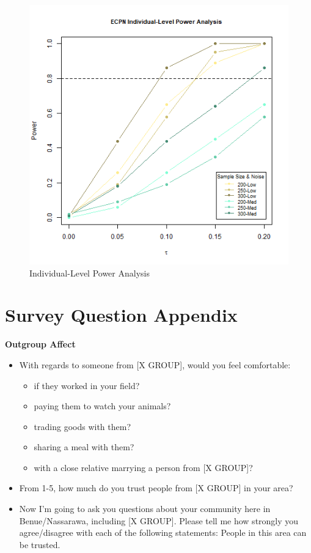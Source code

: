 \documentclass[
]{article}
\providecommand{\tightlist}{%
  \setlength{\itemsep}{0pt}\setlength{\parskip}{0pt}}
\begin{document}
\begin{figure}
\centering
\includegraphics{../../../figures/ecpn_power_figure_ind.png}
\caption{Individual-Level Power Analysis}
\end{figure}

\hypertarget{questions}{%
\section{Survey Question Appendix}\label{questions}}

\textbf{Outgroup Affect}

\begin{itemize}
\tightlist
\item
  With regards to someone from {[}X GROUP{]}, would you feel
  comfortable:

  \begin{itemize}
  \tightlist
  \item
    if they worked in your field?
  \item
    paying them to watch your animals?
  \item
    trading goods with them?
  \item
    sharing a meal with them?
  \item
    with a close relative marrying a person from {[}X GROUP{]}?
  \end{itemize}
\item
  From 1-5, how much do you trust people from {[}X GROUP{]} in your
  area?
\item
  Now I'm going to ask you questions about your community here in
  Benue/Nassarawa, including {[}X GROUP{]}. Please tell me how strongly
  you agree/disagree with each of the following statements: People in
  this area can be trusted.
\end{itemize}
\end{document}
